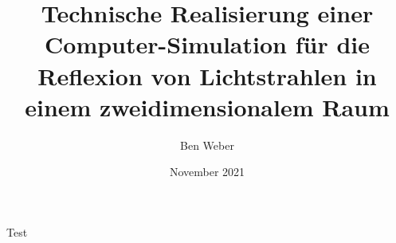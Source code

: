 \documentclass[12pt, a4paper]{report}
\title{Technische Realisierung einer Computer-Simulation für die Reflexion von Lichtstrahlen in einem zweidimensionalem Raum}
\author{Ben Weber}
\date{November 2021}
\begin{document}
   \maketitle
   
   \tableofcontents
   \clearpage

   
   
   

   Test \parencite[vgl.][S. 15]{hering2017optik}

   \printbibliography
\end{document}
